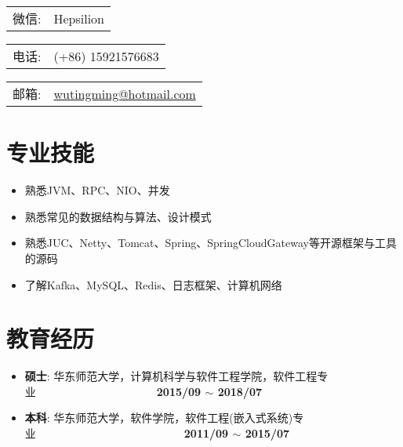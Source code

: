 \documentclass[letterpaper, UTF8, 11pt]{article}
\def\name{\textbf{\textcolor[rgb]{0.00, 0.00, 0.00}{\fontsize{30pt}{30pt}吴庭明}} ~~~~~~~~~ \fontsize{15pt}{15pt}}
\begin{document}
	
	\noindent{\bf \name} 
	\vspace{0.1in}

	\begin{minipage}{0.2\linewidth}
		\begin{tabular}{ll}
			微信:   & Hepsilion 
		\end{tabular}
	\end{minipage}
	\begin{minipage}{0.3\linewidth}
		\begin{tabular}{ll}
			电话:   & (+86) 15921576683  
		\end{tabular}
	\end{minipage}
	\begin{minipage}{0.5\linewidth}
		\begin{tabular}{ll}
			邮箱:   & \href{mailto:wutingming@hotmail.com}{ wutingming@hotmail.com} 
		\end{tabular}
	\end{minipage}
	\vspace{-0.1in}
	
	
	\section*{\textbf{专业技能}}\vspace{-0.15in}
	\begin{itemize}
		\item 熟悉JVM、RPC、NIO、并发
		\item 熟悉常见的数据结构与算法、设计模式
		\item 熟悉JUC、Netty、Tomcat、Spring、SpringCloudGateway等开源框架与工具的源码
		\item 了解Kafka、MySQL、Redis、日志框架、计算机网络

	\end{itemize}
	\vspace{-0.25in}
	
	\section*{\textbf{教育经历}}\vspace{-0.15in}
	\begin{itemize}
		\item \textbf{硕士}: 华东师范大学，计算机科学与软件工程学院，软件工程专业~~~~~~~~~~~~~~~~~~~~~~\textbf{2015/09 $\sim$ 2018/07}
		\item \textbf{本科}: 华东师范大学，软件学院，软件工程(嵌入式系统)专业~~~~~~~~~~~~~~~~~~~~~~~~~~~\textbf{2011/09 $\sim$ 2015/07}
	\end{itemize}
	\vspace{-0.25in}
	
\end{document}
